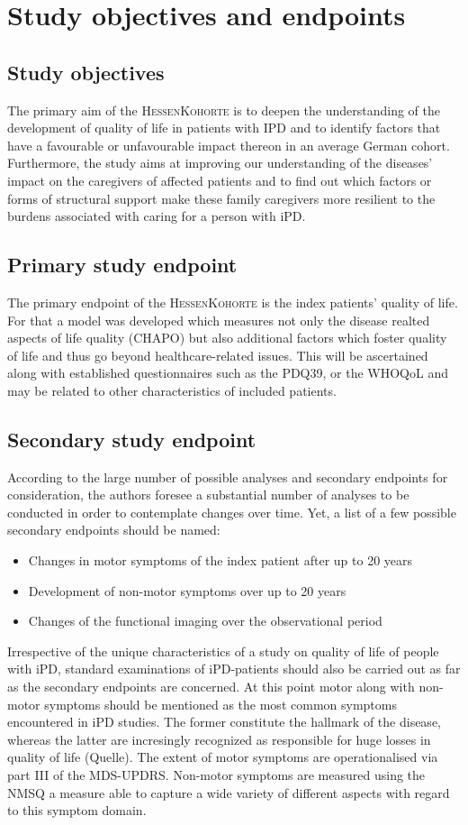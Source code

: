 \section{Study objectives and endpoints}
\subsection{Study objectives}
The primary aim of the \textsc{HessenKohorte} is to deepen the understanding of the development of quality of life in patients with IPD and to identify factors that have a favourable or unfavourable impact thereon in an average German cohort. Furthermore, the study aims at improving our understanding of the diseases' impact on the caregivers of affected patients and to find out which factors or forms of structural support make these family caregivers more resilient to the burdens associated with caring for a person with \ac{iPD}.

\subsection{Primary study endpoint}
The primary endpoint of the \textsc{HessenKohorte} is the index patients' quality of life. For that a model was developed which measures not only the disease realted aspects of life quality (\ac{CHAPO}) but also additional factors which foster quality of life and thus go beyond healthcare-related issues. This will be ascertained along with established questionnaires such as the \ac{PDQ39}, or the \ac{WHOQoL} and may be related to other characteristics of included patients.

\subsection{Secondary study endpoint}
According to the large number of possible analyses and secondary endpoints for consideration, the authors foresee a substantial
number of analyses to be conducted in order to contemplate changes over time. Yet, a list of a few possible secondary endpoints should be named:
\begin{itemize}
  \item{Changes in motor symptoms of the index patient after up to 20 years}
  \item{Development of non-motor symptoms over up to 20 years}
  \item{Changes of the functional imaging over the observational period} 
\end{itemize}
Irrespective of the unique characteristics of a study on quality of life of people with \ac{iPD}, standard examinations of \ac{iPD}-patients should also be carried out as far as the secondary endpoints are concerned. At this point motor along with non-motor symptoms should be mentioned as the most common symptoms encountered in \ac{iPD} studies. The former constitute the hallmark of the disease, whereas the latter are incresingly recognized as responsible for huge losses in quality of life (Quelle). The extent of motor symptoms are operationalised via part III of the \ac{MDS-UPDRS}. Non-motor symptoms are measured using the \ac{NMSQ} a measure able to capture a wide variety of different aspects with regard to this symptom domain.

